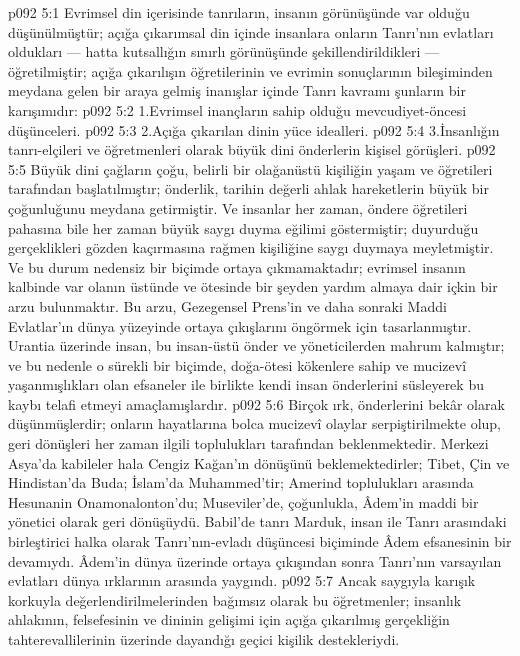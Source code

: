 \vs p092 5:1 Evrimsel din içerisinde tanrıların, insanın görünüşünde var olduğu düşünülmüştür; açığa çıkarımsal din içinde insanlara onların Tanrı’nın evlatları oldukları --- hatta kutsallığın sınırlı görünüşünde şekillendirildikleri --- öğretilmiştir; açığa çıkarılışın öğretilerinin ve evrimin sonuçlarının bileşiminden meydana gelen bir araya gelmiş inanışlar içinde Tanrı kavramı şunların bir karışımıdır:
\vs p092 5:2 1.\bibnobreakspace Evrimsel inançların sahip olduğu mevcudiyet\hyp{}öncesi düşünceleri.
\vs p092 5:3 2.\bibnobreakspace Açığa çıkarılan dinin yüce idealleri.
\vs p092 5:4 3.\bibnobreakspace İnsanlığın tanrı\hyp{}elçileri ve öğretmenleri olarak büyük dini önderlerin kişisel görüşleri.
\vs p092 5:5 Büyük dini çağların çoğu, belirli bir olağanüstü kişiliğin yaşam ve öğretileri tarafından başlatılmıştır; önderlik, tarihin değerli ahlak hareketlerin büyük bir çoğunluğunu meydana getirmiştir. Ve insanlar her zaman, öndere öğretileri pahasına bile her zaman büyük saygı duyma eğilimi göstermiştir; duyurduğu gerçeklikleri gözden kaçırmasına rağmen kişiliğine saygı duymaya meyletmiştir. Ve bu durum nedensiz bir biçimde ortaya çıkmamaktadır; evrimsel insanın kalbinde var olanın üstünde ve ötesinde bir şeyden yardım almaya dair içkin bir arzu bulunmaktır. Bu arzu, Gezegensel Prens’in ve daha sonraki Maddi Evlatlar’ın dünya yüzeyinde ortaya çıkışlarını öngörmek için tasarlanmıştır. Urantia üzerinde insan, bu insan\hyp{}üstü önder ve yöneticilerden mahrum kalmıştır; ve bu nedenle o sürekli bir biçimde, doğa\hyp{}ötesi kökenlere sahip ve mucizevî yaşanmışlıkları olan efsaneler ile birlikte kendi insan önderlerini süsleyerek bu kaybı telafi etmeyi amaçlamışlardır.
\vs p092 5:6 Birçok ırk, önderlerini bekâr olarak düşünmüşlerdir; onların hayatlarına bolca mucizevî olaylar serpiştirilmekte olup, geri dönüşleri her zaman ilgili toplulukları tarafından beklenmektedir. Merkezi Asya’da kabileler hala Cengiz Kağan’ın dönüşünü beklemektedirler; Tibet, Çin ve Hindistan’da Buda; İslam’da Muhammed’tir; Amerind toplulukları arasında Hesunanin Onamonalonton’du; Museviler’de, çoğunlukla, Âdem’in maddi bir yönetici olarak geri dönüşüydü. Babil’de tanrı Marduk, insan ile Tanrı arasındaki birleştirici halka olarak Tanrı’nın\hyp{}evladı düşüncesi biçiminde Âdem efsanesinin bir devamıydı. Âdem’in dünya üzerinde ortaya çıkışından sonra Tanrı’nın varsayılan evlatları dünya ırklarının arasında yaygındı.
\vs p092 5:7 Ancak saygıyla karışık korkuyla değerlendirilmelerinden bağımsız olarak bu öğretmenler; insanlık ahlakının, felsefesinin ve dininin gelişimi için açığa çıkarılmış gerçekliğin tahterevallilerinin üzerinde dayandığı geçici kişilik destekleriydi.
